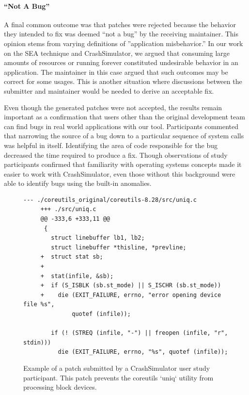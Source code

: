 \paragraph{``Not A Bug''}
A final common outcome was that patches were rejected because the behavior they intended to fix was deemed ``not a bug'' by the receiving maintainer.
This opinion stems from varying definitions of ''application misbehavior.''
In our work on the SEA technique and CrashSimulator, we argued that  consuming large amounts of resources or running forever constituted undesirable behavior in an application.
The maintainer in this case argued that such outcomes may be correct
for some usages.
This is another situation where discussions between the submitter and maintainer would be needed to derive an acceptable fix.

Even though the generated patches were not accepted,
the results remain
important as a confirmation that 
users other than the original development team
can find bugs in real world applications with our tool.
Participants commented that narrowing the source of a bug
down to a particular sequence of system calls
was helpful in itself. Identifying the area of
code responsible for the bug decreased the time required to produce a fix.
Though observations of study participants
confirmed that familiarity with operating systems concepts
made it easier to work with CrashSimulator, even
those without this background were able to identify bugs using the
built-in anomalies.


 \begin{figure}
 \begin{lstlisting}[basicstyle=\ttfamily,gobble=4]
     --- ./coreutils_original/coreutils-8.28/src/uniq.c
     +++ ./src/uniq.c
     @@ -333,6 +333,11 @@
      {
        struct linebuffer lb1, lb2;
        struct linebuffer *thisline, *prevline;
     +  struct stat sb;
     +
     +  stat(infile, &sb);
     +  if (S_ISBLK (sb.st_mode) || S_ISCHR (sb.st_mode))
     +    die (EXIT_FAILURE, errno, "error opening device file %s",
              quotef (infile));

        if (! (STREQ (infile, "-") || freopen (infile, "r", stdin)))
          die (EXIT_FAILURE, errno, "%s", quotef (infile));
\end{lstlisting}
\caption[Participant Submitted Patch]{Example of a patch submitted by a CrashSimulator user study participant.
This patch prevents the coreutils `uniq` utility from processing block devices. }
\label{fig:participantpatch}
\end{figure}

